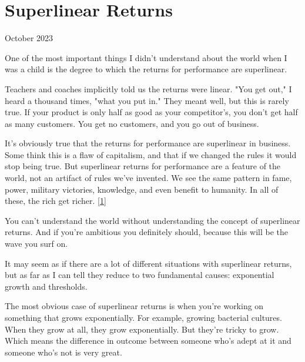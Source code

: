 \chapter{Superlinear Returns}


            
              
                

October 2023

One of the most important things I
                  didn't understand about the world when I was a child is the
                  degree to which the returns for performance are
                  superlinear.

Teachers and coaches implicitly told
                  us the returns were linear. "You get out," I heard a thousand
                  times, "what you put in." They meant well, but this is rarely
                  true. If your product is only half as good as your
                  competitor's, you don't get half as many customers. You get no
                  customers, and you go out of business.

It's
                  obviously true that the returns for performance are
                  superlinear in business. Some think this is a flaw of
                  capitalism, and that if we changed the rules it would stop
                  being true. But superlinear returns for performance are a
                  feature of the world, not an artifact of rules we've invented.
                  We see the same pattern in fame, power, military victories,
                  knowledge, and even benefit to humanity. In all of these, the
                  rich get richer.
                  [\href{\#f1n}{1}]

You can't understand the world without
                  understanding the concept of superlinear returns. And if
                  you're ambitious you definitely should, because this will be
                  the wave you surf on.





It
                  may seem as if there are a lot of different situations with
                  superlinear returns, but as far as I can tell they reduce to
                  two fundamental causes: exponential growth and thresholds.

The
                  most obvious case of superlinear returns is when you're
                  working on something that grows exponentially. For example,
                  growing bacterial cultures. When they grow at all, they grow
                  exponentially. But they're tricky to grow. Which means the
                  difference in outcome between someone who's adept at it and
                  someone who's not is very great.


